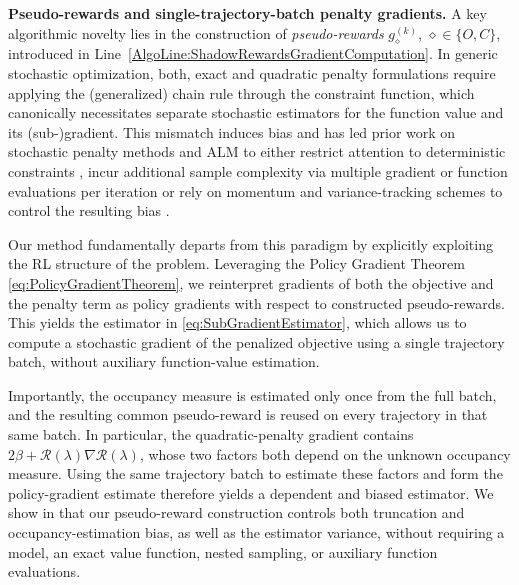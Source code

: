 \documentclass{article}
\theoremstyle{plain}
\theoremstyle{definition}
\theoremstyle{remark}
\DeclarePairedDelimiter{\plus}{[}{]_{+}}
\def\Reg{{\mathcal{R}}}
\begin{document}
\textbf{Pseudo-rewards and single-trajectory-batch penalty
 gradients.}
A key algorithmic novelty lies in the construction of \emph{pseudo-rewards}
$g^{(k)}_\diamond$, $\diamond \in \{O, C\}$,
introduced in Line~\ref{AlgoLine:ShadowRewardsGradientComputation}.
In generic stochastic
optimization, both, exact and quadratic penalty formulations require
applying the (generalized) chain rule through the constraint function,
which canonically necessitates separate stochastic estimators for the
function value and its (sub-)gradient. This mismatch induces bias and has
led prior work on stochastic penalty methods and ALM to
either restrict attention to deterministic constraints
\cite{kushnerPenaltyFunctionMethods1974,
 wangStochasticOptimisationInequality2008,
 wangRobinsMonroAugmentedLagrangian2022},
incur additional sample complexity via multiple gradient or function evaluations per
iteration
\cite{cuiExactPenaltyMethod2025, liuSingleloopSPIDERtypeStochastic2025,
 yangSingleloopAlgorithmsStochastic2025}
or rely on momentum and variance-tracking schemes to control the
resulting bias \cite{ liStochasticInexactAugmented2024,
 liRetentionCentricFrameworkContinual2025}.

Our method fundamentally departs from this paradigm by explicitly
exploiting the RL structure of the problem. Leveraging the Policy Gradient
Theorem \eqref{eq:PolicyGradientTheorem}, we reinterpret gradients of both
the objective and the penalty term as policy gradients with respect to
constructed pseudo-rewards. This yields the estimator in
\eqref{eq:SubGradientEstimator}, which allows us to compute a stochastic
gradient of the penalized objective using a single trajectory batch,
without auxiliary function-value estimation.

Importantly, the occupancy measure is estimated only once from the full
batch, and the resulting common pseudo-reward is reused on every trajectory
in that same batch. In particular, the quadratic-penalty gradient contains
$2\beta\plus{\Reg(\lambda)}\nabla\Reg(\lambda)$, whose two factors both
depend on the unknown occupancy measure. Using the same trajectory batch to
estimate these factors and form the policy-gradient estimate therefore
yields a dependent and biased estimator. We show in
that our pseudo-reward construction controls both truncation and
occupancy-estimation bias, as well as the estimator variance, without
requiring a model, an exact value function, nested sampling, or auxiliary
function evaluations.
\end{document}

